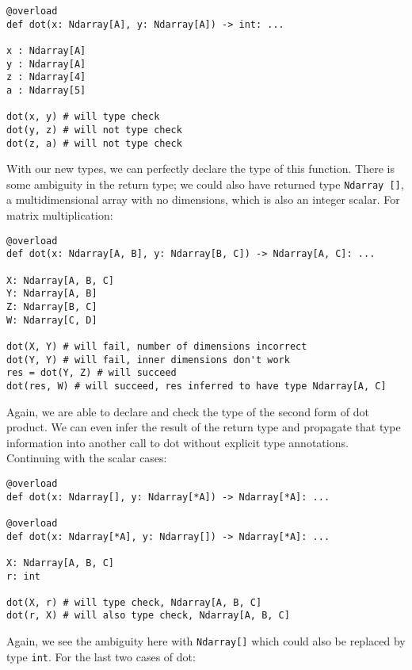 \documentclass[12pt]{report}
\begin{document}
\begin{singlespace*}
\begin{verbatim}
@overload
def dot(x: Ndarray[A], y: Ndarray[A]) -> int: ...

x : Ndarray[A]
y : Ndarray[A]
z : Ndarray[4]
a : Ndarray[5]

dot(x, y) # will type check
dot(y, z) # will not type check
dot(z, a) # will not type check
\end{verbatim}
\end{singlespace*}
With our new types, we can perfectly declare the type of this function. There is some ambiguity in the return type; we could also have returned type \texttt{Ndarray []}, a multidimensional array with no dimensions, which is also an integer scalar. For matrix multiplication:

\begin{singlespace*}
\begin{verbatim}
@overload
def dot(x: Ndarray[A, B], y: Ndarray[B, C]) -> Ndarray[A, C]: ...

X: Ndarray[A, B, C]
Y: Ndarray[A, B]
Z: Ndarray[B, C]
W: Ndarray[C, D]

dot(X, Y) # will fail, number of dimensions incorrect
dot(Y, Y) # will fail, inner dimensions don't work
res = dot(Y, Z) # will succeed
dot(res, W) # will succeed, res inferred to have type Ndarray[A, C]\end{verbatim}
\end{singlespace*}
Again, we are able to declare and check the type of the second form of dot product. We can even infer the result of the return type and propagate that type information into another call to dot without explicit type annotations. Continuing with the scalar cases:

\begin{singlespace*}
\begin{verbatim}
@overload
def dot(x: Ndarray[], y: Ndarray[*A]) -> Ndarray[*A]: ...

@overload
def dot(x: Ndarray[*A], y: Ndarray[]) -> Ndarray[*A]: ...

X: Ndarray[A, B, C]
r: int

dot(X, r) # will type check, Ndarray[A, B, C]
dot(r, X) # will also type check, Ndarray[A, B, C]\end{verbatim}
\end{singlespace*}
Again, we see the ambiguity here with \texttt{Ndarray[]} which could also be replaced by type \texttt{int}. For the last two cases of dot:
\end{document}
